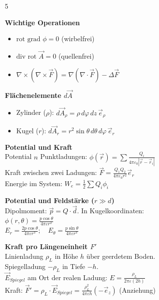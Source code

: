 \documentclass[a4paper, 2pt, landscape]{extarticle}
\begin{document}
\begin{multicols*}{5}
\begin{tcolorbox}[title={Vektoranalysis: Identitäten \& Koordinaten}, colback=white, colframe=black]
\textbf{Wichtige Operationen}
\begin{itemize}
    \item $\text{rot grad } \phi = 0$ (wirbelfrei)
    \item $\text{div rot } \vec{A} = 0$ (quellenfrei)
    \item $\nabla \times (\nabla \times \vec{F}) = \nabla (\nabla \cdot \vec{F}) - \Delta \vec{F}$
\end{itemize}
\textbf{Flächenelemente $d\vec{A}$}
\begin{itemize}
    \item Zylinder ($\rho$): $d\vec{A}_\rho = \rho \, d\varphi \, dz \, \vec{e}_\rho$
    \item Kugel ($r$): $d\vec{A}_r = r^2 \sin\theta \, d\theta \, d\varphi \, \vec{e}_r$
\end{itemize}
\end{tcolorbox}

\begin{tcolorbox}[title={Elektrostatik: Punktladungen (Blatt 2/3)}, colback=white, colframe=black]
\textbf{Potential und Kraft} \\
Potential $n$ Punktladungen: $\phi(\vec{r}) = \sum \frac{Q_i}{4\pi\varepsilon_0 |\vec{r}-\vec{r}_i|}$ \\
Kraft zwischen zwei Ladungen: $\vec{F} = \frac{Q_1 Q_2}{4\pi\varepsilon_0 r^2} \vec{e}_r$ \\
Energie im System: $W_e = \frac{1}{2} \sum Q_i \phi_i$
\end{tcolorbox}


\begin{tcolorbox}[title={Elektrostatik: Elektrischer Dipol (Fernfeld)}, colback=white, colframe=black]
\textbf{Potential und Feldstärke ($r \gg d$)} \\
Dipolmoment: $\vec{p} = Q \cdot \vec{d}$. In Kugelkoordinaten: \\
$\phi(r, \theta) = \frac{p \cos\theta}{4\pi\varepsilon r^2}$ \\
$E_r = \frac{2p \cos\theta}{4\pi\varepsilon r^3} ; \quad E_\theta = \frac{p \sin\theta}{4\pi\varepsilon r^3}$
\end{tcolorbox}

\begin{tcolorbox}[title={Spiegelung: Kraft auf Linienladung (Blatt 4)}, colback=white, colframe=black]
\textbf{Kraft pro Längeneinheit $F'$} \\
Linienladung $\rho_L$ in Höhe $h$ über geerdetem Boden. \\
Spiegelladung $-\rho_L$ in Tiefe $-h$. \\
$\vec{E}_{Spiegel}$ am Ort der realen Ladung: $E = \frac{\rho_L}{2\pi\varepsilon (2h)}$ \\
Kraft: $\vec{F}' = \rho_L \cdot \vec{E}_{Spiegel} = \frac{\rho_L^2}{4\pi\varepsilon h} (-\vec{e}_z)$ (Anziehung)
\end{tcolorbox}


\end{multicols*}
\end{document}
